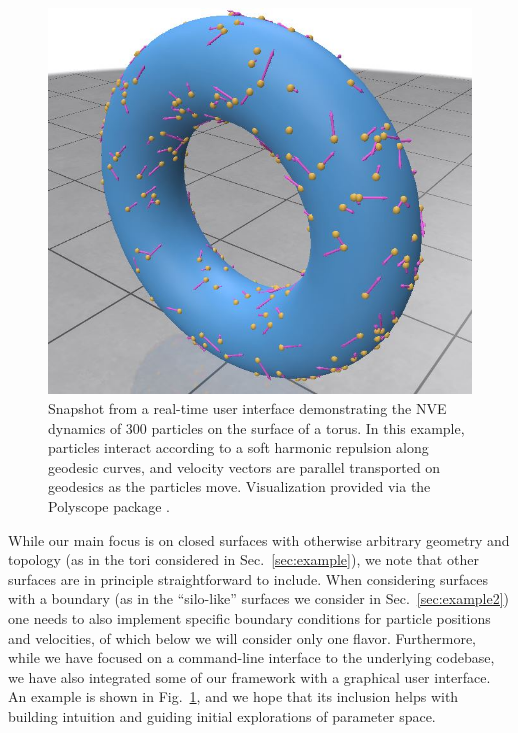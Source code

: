 \documentclass[preprint,12pt]{elsarticle}
\begin{document}
\begin{figure}
    \centering
    \includegraphics[width = 1.0\columnwidth]{UI_demo_v2.JPG}
    \caption{Snapshot from a real-time user interface demonstrating the NVE dynamics of 300 particles on the surface of a torus. In this example, particles interact according to a  soft harmonic repulsion along geodesic curves, and velocity vectors are parallel transported on geodesics as the particles move. Visualization provided via the Polyscope package \cite{polyscope}.}
    \label{fig:UIdemo}
\end{figure}

While our main focus is on closed surfaces with otherwise arbitrary geometry and topology (as in the tori considered in Sec.~\ref{sec:example}), we note that other surfaces are in principle straightforward to include. When considering surfaces with a boundary (as in the ``silo-like'' surfaces we consider in Sec.~\ref{sec:example2}) one needs to also implement specific boundary conditions for particle positions and velocities, of which below we will consider only one flavor.
Furthermore, while we have focused on a command-line interface to the underlying codebase, we have also integrated some of our framework with a graphical user interface. An example is shown in Fig.~\ref{fig:UIdemo}, and we hope that its inclusion helps with building intuition and guiding initial explorations of parameter space.
\end{document}
